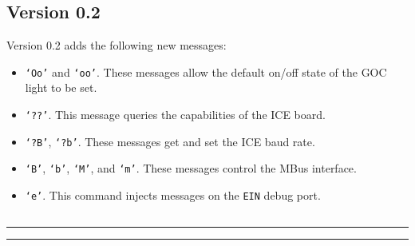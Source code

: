 \subsection{Version 0.2}
\label{protocol-0-2}

Version 0.2 adds the following new messages:
\begin{itemize}
  \item {\tt `Oo'} and {\tt `oo'}. These messages allow the default on/off state of
the GOC light to be set.
  \item {\tt `??'}. This message queries the capabilities of the ICE board.
  \item {\tt `?B'}, {\tt `?b'}. These messages get and set the ICE baud rate.
  \item {\tt `B'}, {\tt `b'}, {\tt `M'}, and {\tt `m'}. These messages control
    the MBus interface.
  \item {\tt `e'}. This command injects messages on the {\tt EIN} debug port.
\end{itemize}

\setcounter{tocdepth}{4}
\etocsettocstyle
    {\subsection*{\contentsname}\hrule\medskip
        }
    {\nobreak\medskip\hrule\bigskip}

\localtableofcontents

